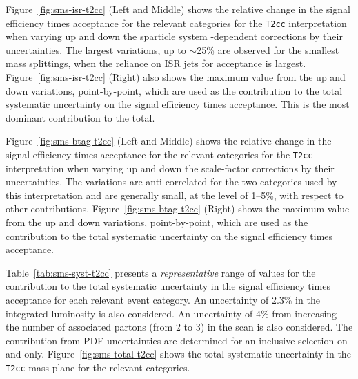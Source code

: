 Figure~\ref{fig:sms-isr-t2cc} (Left and Middle) shows the relative
change in the signal efficiency times acceptance for the relevant
categories for the \verb!T2cc! interpretation when varying up and down
the sparticle system \Pt-dependent corrections by their
uncertainties. The largest variations, up to $\sim$25\% are observed
for the smallest mass splittings, when the reliance on ISR jets for
acceptance is largest. Figure~\ref{fig:sms-isr-t2cc} (Right) also
shows the maximum value from the up and down variations,
point-by-point, which are used as the contribution to the total
systematic uncertainty on the signal efficiency times acceptance. This
is the most dominant contribution to the total.

Figure~\ref{fig:sms-btag-t2cc} (Left and Middle) shows the relative
change in the signal efficiency times acceptance for the relevant
categories for the \verb!T2cc! interpretation when varying up and down
the scale-factor corrections by their uncertainties. The variations
are anti-correlated for the two \nb categories used by this
interpretation and are generally small, at the level of 1--5\%, with
respect to other contributions.  Figure~\ref{fig:sms-btag-t2cc}
(Right) shows the maximum value from the up and down variations,
point-by-point, which are used as the contribution to the total
systematic uncertainty on the signal efficiency times acceptance.

Table~\ref{tab:sms-syst-t2cc} presents a {\it representative} range of
values for the contribution to the total systematic uncertainty in the
signal efficiency times acceptance for each relevant event
category. An uncertainty of 2.3\% in the integrated luminosity is also
considered. An uncertainty of 4\% from increasing the number of
associated partons (from 2 to 3) in the scan is also considered. The
contribution from PDF uncertainties are determined for an inclusive
selection on \njet and \nb only. Figure~\ref{fig:sms-total-t2cc} shows
the total systematic uncertainty in the \verb!T2cc! mass plane for the
relevant categories.

